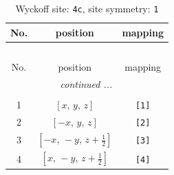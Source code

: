 \documentclass[fleqn,8pt]{jsarticle}
\begin{document}
\begin{longtable}{ccc}
\caption{Wyckoff site: {\tt 4c}, site symmetry: {\tt 1}}
 \\
 \hline \hline
No. & position & mapping \\ \hline \endfirsthead

\multicolumn{2}{l}{\tablename\ \thetable{}} \\
 \hline \hline
No. & position & mapping \\ \hline \endhead

 \hline \hline
\multicolumn{2}{r}{\footnotesize\it continued ...} \\ \endfoot

 \hline \hline
\multicolumn{2}{r}{} \\ \endlastfoot

1 & $\left[ x,\, y,\, z \right]$ & {\tt [1]} \\ \hline
2 & $\left[ - x,\, y,\, z \right]$ & {\tt [2]} \\ \hline
3 & $\left[ - x,\, - y,\, z + \frac{1}{2} \right]$ & {\tt [3]} \\ \hline
4 & $\left[ x,\, - y,\, z + \frac{1}{2} \right]$ & {\tt [4]} \\
\end{longtable}
\end{document}

